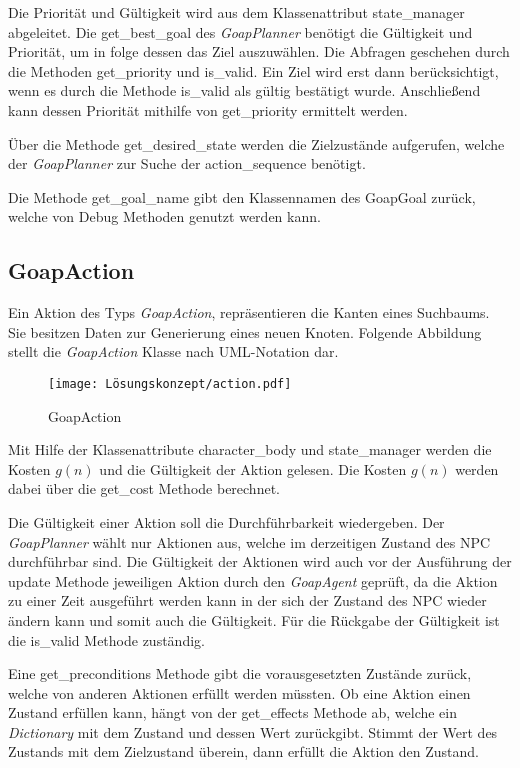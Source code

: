 Die Priorität und Gültigkeit wird aus dem Klassenattribut state\_manager abgeleitet. Die get\_best\_goal des \textit{GoapPlanner} benötigt die Gültigkeit und Priorität, um in folge dessen das Ziel auszuwählen. Die Abfragen geschehen durch die Methoden get\_priority und is\_valid. Ein Ziel wird erst dann berücksichtigt, wenn es durch die Methode is\_valid als gültig bestätigt wurde. Anschlie\ss{}end kann dessen Priorität mithilfe von get\_priority ermittelt werden. 

\"{U}ber die Methode get\_desired\_state werden die Zielzustände aufgerufen, welche der \textit{GoapPlanner} zur Suche der action\_sequence benötigt. 

Die Methode get\_goal\_name gibt den Klassennamen des GoapGoal zurück, welche von Debug Methoden genutzt werden kann.


\subsection{GoapAction}
\label{chap:goapaction uml}

Ein Aktion des Typs \textit{GoapAction}, repräsentieren die Kanten eines Suchbaums. Sie besitzen Daten zur Generierung eines neuen Knoten. Folgende Abbildung stellt die \textit{GoapAction} Klasse nach UML-Notation dar.

\begin{figure}[h]
  \centering
  \texttt{[image: Lösungskonzept/action.pdf]}
	\captionsetup{justification=justified, format=plain}
  \caption{GoapAction}
  \label{fig:GoapAction}
\end{figure}

Mit Hilfe der Klassenattribute character\_body und state\_manager werden die Kosten $g(n)$ und die Gültigkeit der Aktion gelesen. Die Kosten $g(n)$ werden dabei über die get\_cost Methode berechnet.

Die Gültigkeit einer Aktion soll die Durchführbarkeit wiedergeben. Der \textit{GoapPlanner} wählt nur Aktionen aus, welche im derzeitigen Zustand des NPC durchführbar sind. Die Gültigkeit der Aktionen wird auch vor der Ausführung der update Methode jeweiligen Aktion durch den \textit{GoapAgent} geprüft, da die Aktion zu einer Zeit ausgeführt werden kann in der sich der Zustand des NPC wieder ändern kann und somit auch die Gültigkeit. Für die Rückgabe der Gültigkeit ist die is\_valid Methode zuständig.

Eine get\_preconditions Methode gibt die vorausgesetzten Zustände zurück, welche von anderen Aktionen erfüllt werden müssten. Ob eine Aktion einen Zustand erfüllen kann, hängt von der get\_effects Methode ab, welche ein \textit{Dictionary} mit dem Zustand und dessen Wert zurückgibt. Stimmt der Wert des Zustands mit dem Zielzustand überein, dann erfüllt die Aktion den Zustand.

